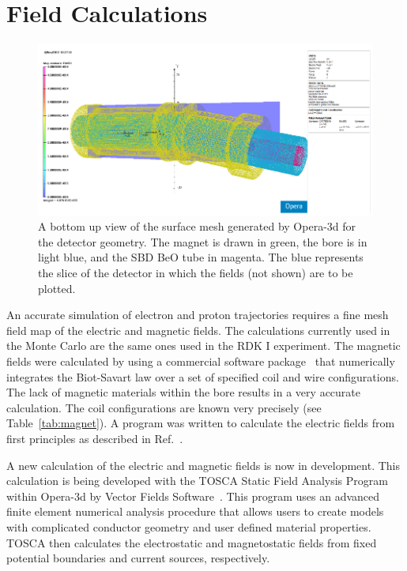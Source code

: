 \documentclass[oneside,12pt]{memoir}
\begin{document}
\section{Field Calculations}
\label{sec:mcfield}
\begin{figure}[t]
	\includegraphics[width=\textwidth]{mesh.png}
	\caption[Surface mesh used in Opera-3d.]{A bottom up view of the surface mesh generated by Opera-3d for the detector geometry. The magnet is drawn in green, the bore is in light blue, and the SBD BeO tube in magenta. The blue represents the slice of the detector in which the fields (not shown) are to be plotted.}
	\label{fig:mesh}
\end{figure}
An accurate simulation of electron and proton trajectories requires a fine mesh field map of the electric and magnetic fields. The calculations currently used in the Monte Carlo are the same ones used in the RDK I experiment. The magnetic fields were calculated by using a commercial software package~\cite{biotsavart} that numerically integrates the Biot-Savart law over a set of specified coil and wire configurations. The lack of magnetic materials within the bore results in a very accurate calculation. The coil configurations are known very precisely (see Table~\ref{tab:magnet}). A program was written to calculate the electric fields from first principles as described in Ref.~\cite{thesis:cooper}.\par
A new calculation of the electric and magnetic fields is now in development. This calculation is being developed with the TOSCA Static Field Analysis Program within Opera-3d by Vector Fields Software~\cite{opera3d}. This program uses an advanced finite element numerical analysis procedure that allows users to create models with complicated conductor geometry and user defined material properties. TOSCA then calculates the electrostatic and magnetostatic fields from fixed potential boundaries and current sources, respectively.\par
\end{document}
